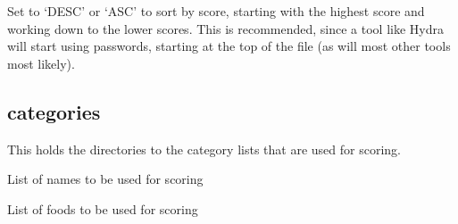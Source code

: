 \documentclass[letterpaper,10pt,english]{sphinxmanual}
\begin{document}
\begin{fulllineitems}
\label{\detokenize{usage:sortby}}
\sphinxAtStartPar
Set to ‘DESC’ or ‘ASC’ to sort by score, starting with the highest score and working down to the lower scores. This is recommended, since a tool like Hydra will start using passwords, starting at the top of the file (as will most other tools most likely).

\begin{sphinxVerbatim}[commandchars=\\\{\}]
   
\end{sphinxVerbatim}

\end{fulllineitems}



\subsection{categories}
\label{\detokenize{usage:categories}}
\sphinxAtStartPar
This holds the directories to the category lists that are used for scoring.

\begin{fulllineitems}
\label{\detokenize{usage:names}}
\sphinxAtStartPar
List of names to be used for scoring

\begin{sphinxVerbatim}[commandchars=\\\{\}]
  
\end{sphinxVerbatim}

\end{fulllineitems}


\begin{fulllineitems}
\label{\detokenize{usage:foods}}
\sphinxAtStartPar
List of foods to be used for scoring

\begin{sphinxVerbatim}[commandchars=\\\{\}]
  
\end{sphinxVerbatim}

\end{fulllineitems}
\end{document}
